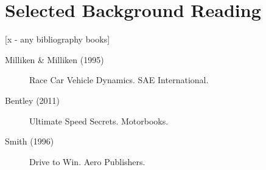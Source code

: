 \documentclass[11pt,a4paper]{report}
\begin{document}
%
%


\cleardoublepage
{}
\chapter*{Selected Background Reading}

[x - any bibliography books]

\begin{description}

\item[Milliken \& Milliken (1995)]
Race Car Vehicle Dynamics.
SAE International.

\item[Bentley (2011)]
Ultimate Speed Secrets.
Motorbooks.

\item[Smith (1996)]
Drive to Win.
Aero Publishers.

\end{description}

\setemptyheader

\pagebreak


\appendix
{}
\fancyhead[R]{\leftmark}
\fancyhead[C]{}
\fancyfoot[C]{\thepage}
\renewcommand{\headrulewidth}{0.4pt}
\renewcommand{\chaptermark}[1]{\markboth{#1}{}}

\fancyhead[R]{\leftmark}

\renewcommand{\thesection}{\thechapter.\arabic{section}}








\fancypagestyle{plain}{%
   \fancyhead{} %
   \fancyfoot[C]{{\thepage} of \pageref{LastPage}} %
   \renewcommand{\headrulewidth}{0pt}
   \renewcommand{\footrulewidth}{0pt}
}

\end{document}
